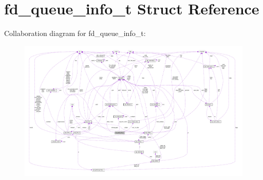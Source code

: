 \hypertarget{structfd__queue__info__t}{}\section{fd\+\_\+queue\+\_\+info\+\_\+t Struct Reference}
\label{structfd__queue__info__t}


Collaboration diagram for fd\+\_\+queue\+\_\+info\+\_\+t\+:
\nopagebreak
\begin{figure}[H]
\begin{center}
\leavevmode
\includegraphics[width=350pt]{structfd__queue__info__t__coll__graph}
\end{center}
\end{figure}
